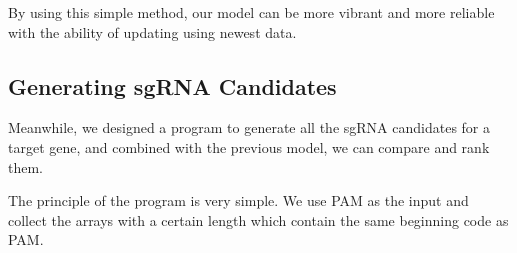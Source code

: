 By using this simple method, our model can be more vibrant and more reliable with the ability of updating using newest data.

\subsection{Generating sgRNA Candidates}
Meanwhile, we designed a program to generate all the sgRNA candidates for a target gene, and combined with the previous model, we can compare and rank them.

The principle of the program  is very simple. We use PAM as the input and collect the arrays with a certain length which contain the same beginning code as PAM.

